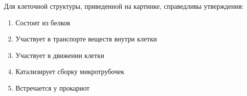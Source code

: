 
Для клеточной структуры,
приведенной на картинке, справедливы утверждения:


\begin{enumerate}
    \item Состоит из белков
    \item Участвует в транспорте веществ внутри клетки
    \item Участвует в движении клетки
    \item Катализирует сборку микротрубочек
    \item Встречается у прокариот
\end{enumerate}

